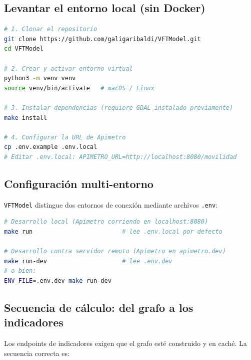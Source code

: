 \subsection*{Levantar el entorno local (sin Docker)}

\begin{lstlisting}[language=bash,
    caption={Secuencia completa para levantar VFTModel en desarrollo local.},
    label=lst:vft-setup]
# 1. Clonar el repositorio
git clone https://github.com/galigaribaldi/VFTModel.git
cd VFTModel

# 2. Crear y activar entorno virtual
python3 -m venv venv
source venv/bin/activate   # macOS / Linux

# 3. Instalar dependencias (requiere GDAL instalado previamente)
make install

# 4. Configurar la URL de Apimetro
cp .env.example .env.local
# Editar .env.local: APIMETRO_URL=http://localhost:8080/movilidad
\end{lstlisting}

\subsection*{Configuración multi-entorno}

\texttt{VFTModel} distingue dos entornos de conexión mediante archivos \texttt{.env}:

\begin{lstlisting}[language=bash,
    caption={Selección de entorno mediante variable \texttt{ENV\_FILE}.},
    label=lst:vft-envfile]
# Desarrollo local (Apimetro corriendo en localhost:8080)
make run                         # lee .env.local por defecto

# Desarrollo contra servidor remoto (Apimetro en apimetro.dev)
make run-dev                     # lee .env.dev
# o bien:
ENV_FILE=.env.dev make run-dev
\end{lstlisting}

\subsection*{Secuencia de cálculo: del grafo a los indicadores}

Los endpoints de indicadores exigen que el grafo esté construido y en caché. La
secuencia correcta es:

